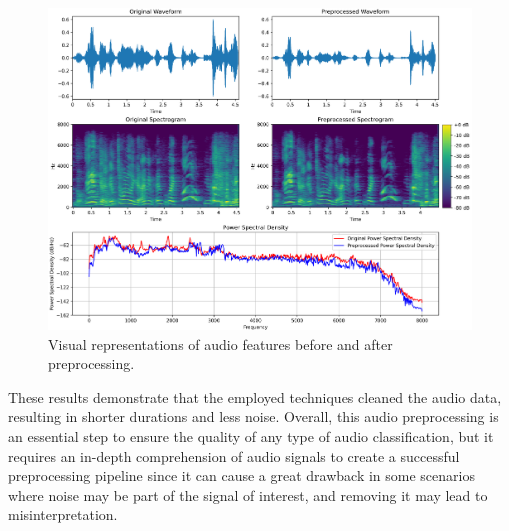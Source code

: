 \begin{figure}[H]
	\centering
	\includegraphics[width=\textwidth]{figs/4_2_preprocessing/preprocessing.png}
	\caption{Visual representations of audio features before and after preprocessing.}
	\label{fig:prep}
\end{figure}

These results demonstrate that the employed techniques cleaned the audio data, resulting in shorter durations and less noise. Overall, this audio preprocessing is an essential step to ensure the quality of any type of audio classification, but it requires an in-depth comprehension of audio signals to create a successful preprocessing pipeline since it can cause a great drawback in some scenarios where noise may be part of the signal of interest, and removing it may lead to misinterpretation.
